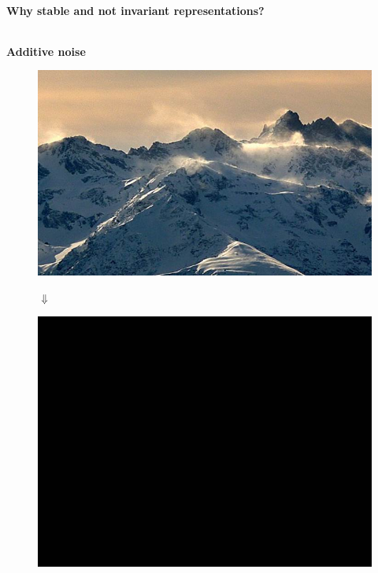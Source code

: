\documentclass[10pt]{beamer}
\begin{document}
\begin{darkframes}
    \begin{frame}[label=stable]{\subsecname}
    \framesubtitle{Why stable and not invariant representations?}
    \begin{columns}
            \begin{center}
            \textbf{Additive noise}
            \begin{figure}
            \centering
            \includegraphics[height=0.25\textheight]{resources/25639-9_1.jpg}
            
            $\Downarrow$ \vspace{0.01\textheight}
            
            \includegraphics[height=0.25\textheight]{resources/25639-9_6.jpg}
            \end{figure}
            \end{center}
        

\end{columns}
\end{frame}
\end{darkframes}
\end{document}
